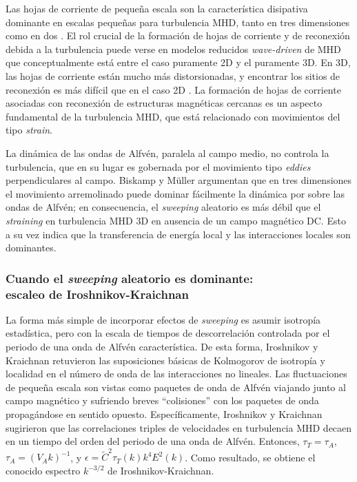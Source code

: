 Las hojas de corriente de pequeña escala son la característica
disipativa dominante en escalas pequeñas para turbulencia MHD, tanto
en tres dimensiones \cite{biskamp_scaling_2000} como en dos
\cite{matthaeus_turbulent_1986}. El rol crucial de la formación de
hojas de corriente y de reconexión debida a la turbulencia puede verse
\cite{dmitruk_coronal_2002} en modelos reducidos \textit{wave-driven}
de MHD que conceptualmente está entre el caso puramente 2D y el
puramente 3D. En 3D, las hojas de corriente están mucho más
distorsionadas, y encontrar los sitios de reconexión es más difícil
que en el caso 2D \cite{politano_current_1995}. La formación de hojas
de corriente asociadas con reconexión de estructuras magnéticas
cercanas es un aspecto fundamental de la turbulencia MHD, que está
relacionado con movimientos del tipo \textit{strain}.

La dinámica de las ondas de Alfvén, paralela al campo medio, no
controla la turbulencia, que en su lugar es gobernada por el
movimiento tipo \textit{eddies} perpendiculares al campo. Biskamp y
M\"uller argumentan que en tres dimensiones el movimiento arremolinado
puede dominar fácilmente la dinámica por sobre las ondas de Alfv\'en;
en consecuencia, el \textit{sweeping} aleatorio es más débil que el
\textit{straining} en turbulencia MHD 3D en ausencia de un campo
magnético DC. Esto a su vez indica que la transferencia de energía
local y las interacciones locales son dominantes.


\subsubsection{Cuando el \textit{sweeping} aleatorio es dominante:\\
  escaleo de Iroshnikov-Kraichnan}\label{sec:escaleoI-K} La forma más
simple de incorporar efectos de \textit{sweeping} es asumir isotropía
estadística, pero con la escala de tiempos de descorrelación
controlada por el periodo de una onda de Alfv\'en característica.  De
esta forma, Iroshnikov \cite{iroshnikov_turbulence_1964} y Kraichnan
\cite{kraichnan_inertial-range_1965} retuvieron las suposiciones
básicas de Kolmogorov de isotropía y localidad en el número de onda de
las interacciones no lineales. Las fluctuaciones de pequeña escala son
vistas como paquetes de onda de Alfv\'en viajando junto al campo
magnético y sufriendo breves ``colisiones'' con los paquetes de onda
propagándose en sentido opuesto. Específicamente, Iroshnikov y
Kraichnan sugirieron que las correlaciones triples de velocidades en
turbulencia MHD decaen en un tiempo del orden del periodo de una onda
de Alfv\'en. Entonces, $\tau_T = \tau_A$, $\tau_A = (V_A k)^{-1}$, y
$\epsilon = \tilde{C}^2 \tau_T(k) k^4 E^2(k)$. Como resultado, se
obtiene el conocido espectro $k^{-3/2}$ de Iroshnikov-Kraichnan.


